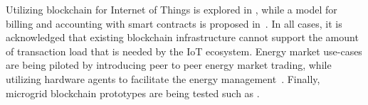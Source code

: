 Utilizing blockchain for Internet of Things is explored in \cite{iot, integrationiot}, while a model for billing and accounting with smart contracts is proposed in~\cite{billaccount}. In all cases, it is acknowledged that existing blockchain infrastructure cannot support the amount of transaction load that is needed by the IoT ecosystem. Energy market use-cases are being piloted by introducing peer to peer energy market trading, while utilizing hardware agents to facilitate the energy management~\cite{gridplus, powerledger}. Finally, microgrid blockchain prototypes are being tested such as \cite{brooklyn, DBLP:journals/ife/MengelkampNBDW18}.